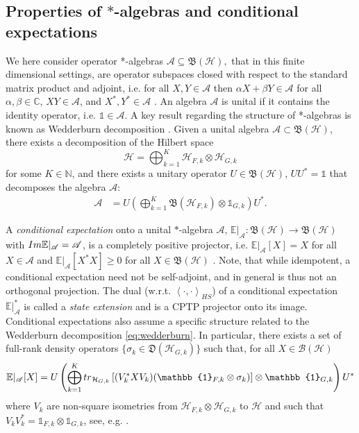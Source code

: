 \documentclass[aihp,12pt]{imsart}
\newcommand{\Hc}{\mathcal{H}}
\newcommand{\As}{\mathscr{A}}
\newcommand{\Cb}{\mathbb{C}}
\newcommand{\Nb}{\mathbb{N}}
\newcommand{\Bf}{\mathfrak{B}}
\newcommand{\Df}{\mathfrak{D}}
\newcommand{\CE}{\mathbb{E}|}
\newcommand{\one}{\mathbb{1}}
\newcommand{\tr}{{\rm tr}}
\newcommand{\inner}[2]{\left< #1,#2 \right>}
\theoremstyle{theorem}
\theoremstyle{definition}
\theoremstyle{remark}
\begin{document}
\subsection{Properties of $*$-algebras and conditional expectations}
We here consider operator *-algebras  $\As\subseteq\Bf(\Hc),$ that in this finite dimensional settings, are operator subspaces closed with respect to the standard matrix product and adjoint, i.e. for all $X,Y\in\As$ then $\alpha X+\beta Y\in \As$ for all $\alpha,\beta\in\Cb$, $XY\in\As$, and $X^*, Y^* \in\As$ \cite{blackadar2006operator}. An algebra $\As$ is unital if it contains the identity operator, i.e. $\one \in\As$. A key result regarding the structure  of *-algebras is known as Wedderburn decomposition \cite{wedderburn1908hypercomplex}. 
Given a unital algebra $\As\subset\Bf(\Hc)$, there exists a decomposition of the Hilbert space
\[\Hc = \bigoplus_{k=1}^K \Hc_{F,k}\otimes\Hc_{G,k} \]
for some $K\in\Nb$, 
and there exists a unitary operator $U\in\Bf(\Hc)$, $U U^* = \one$ that decomposes the algebra $\As$:
\begin{align}
    \As &= U\left(\bigoplus_{k=1}^K \Bf(\Hc_{F,k}) \otimes \one_{G,k}\right)U^*\label{eq:wedderburn}.
\end{align}

A {\em conditional expectation} onto a unital $*$-algebra $\As$, $\CE_\As:\Bf(\Hc)\to\Bf(\Hc)$ with ${\rm Im}\CE_\As = \As$, is a completely positive projector, i.e. $\CE_\As[X] = X$ for all $X\in\As$ and $\CE_\As[X^* X]\geq 0$ for all $X\in\Bf(\Hc)$ \cite{blackadar2006operator}.
Note, that while idempotent, a conditional expectation need not be self-adjoint, and in general is thus not an orthogonal projection. The dual (w.r.t. $\inner{\cdot}{\cdot}_{HS}$) of a conditional expectation $\CE_\As^*$ is called a \textit{state extension} and is a CPTP projector onto its image. Conditional expectations also assume a specific structure related to the Wedderburn decomposition \eqref{eq:wedderburn}. In particular, there exists a set of full-rank density operators $\{\sigma_k\in\Df(\mathcal{H}_{G,k})\}$ such that, for all $X\in\mathcal{B(H)}$
    \begin{align}
         \CE_\mathscr{A}[X] 
         = U\left(\bigoplus_{k=1}^{K} \tr_{\Hc_{G,k}}\left[(V_k^* X V_k)(\one_{F,k}\otimes\sigma_k)\right]\otimes\one_{G,k}\right)U^*
        \label{eqn:cond_exp_blocks}
    \end{align}
where $V_k$ are non-square isometries from $\Hc_{F,k}\otimes\Hc_{G,k}$ to $\Hc$ and such that $V_k V_k^*=\one_{F,k}\otimes \one_{G,k}$, see, e.g. \cite{wolf2012quantum}.
\end{document}
